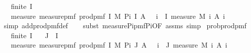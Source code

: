 \begin{isabellebody}
\ \ \ {\isachardoublequoteopen}finite\ I{\isachardoublequoteclose}\isanewline
\ \ \ {\isachardoublequoteopen}measure\ {\isacharparenleft}{\kern0pt}measure{\isacharunderscore}{\kern0pt}pmf\ {\isacharparenleft}{\kern0pt}prod{\isacharunderscore}{\kern0pt}pmf\ I\ M{\isacharparenright}{\kern0pt}{\isacharparenright}{\kern0pt}\ {\isacharparenleft}{\kern0pt}Pi\ I\ A{\isacharparenright}{\kern0pt}\ {\isacharequal}{\kern0pt}\ {\isacharparenleft}{\kern0pt}{\isasymProd}\ i\ {\isasymin}\ I{\isachardot}{\kern0pt}\ measure\ {\isacharparenleft}{\kern0pt}M\ i{\isacharparenright}{\kern0pt}\ {\isacharparenleft}{\kern0pt}A\ i{\isacharparenright}{\kern0pt}{\isacharparenright}{\kern0pt}{\isachardoublequoteclose}\isanewline
%
\isadelimproof
\ \ %
\endisadelimproof
%
\isatagproof
{}\isamarkupfalse%
\ {\isacharparenleft}{\kern0pt}simp\ add{\isacharcolon}{\kern0pt}prod{\isacharunderscore}{\kern0pt}pmf{\isacharunderscore}{\kern0pt}def{\isacharparenright}{\kern0pt}\isanewline
\ \ \isamarkupfalse%
\ {\isacharparenleft}{\kern0pt}subst\ measure{\isacharunderscore}{\kern0pt}Pi{\isacharunderscore}{\kern0pt}pmf{\isacharunderscore}{\kern0pt}Pi{\isacharbrackleft}{\kern0pt}OF\ assms{\isacharparenleft}{\kern0pt}{}{\isacharparenright}{\kern0pt}{\isacharbrackright}{\kern0pt}{\isacharcomma}{\kern0pt}\ simp{\isacharparenright}{\kern0pt}%
\endisatagproof
{\isafoldproof}%
%
\isadelimproof
\isanewline
%
\endisadelimproof
\isanewline
{}\isamarkupfalse%
\ prob{\isacharunderscore}{\kern0pt}prod{\isacharunderscore}{\kern0pt}pmf{\isacharprime}{\kern0pt}{\isacharcolon}{\kern0pt}\ \isanewline
\ \ \ {\isachardoublequoteopen}finite\ I{\isachardoublequoteclose}\isanewline
\ \ \ {\isachardoublequoteopen}J\ {\isasymsubseteq}\ I{\isachardoublequoteclose}\isanewline
\ \ \ {\isachardoublequoteopen}measure\ {\isacharparenleft}{\kern0pt}measure{\isacharunderscore}{\kern0pt}pmf\ {\isacharparenleft}{\kern0pt}prod{\isacharunderscore}{\kern0pt}pmf\ I\ M{\isacharparenright}{\kern0pt}{\isacharparenright}{\kern0pt}\ {\isacharparenleft}{\kern0pt}Pi\ J\ A{\isacharparenright}{\kern0pt}\ {\isacharequal}{\kern0pt}\ {\isacharparenleft}{\kern0pt}{\isasymProd}\ i\ {\isasymin}\ J{\isachardot}{\kern0pt}\ measure\ {\isacharparenleft}{\kern0pt}M\ i{\isacharparenright}{\kern0pt}\ {\isacharparenleft}{\kern0pt}A\ i{\isacharparenright}{\kern0pt}{\isacharparenright}{\kern0pt}{\isachardoublequoteclose}\isanewline
%
\isadelimproof
%
\endisadelimproof
%
\isatagproof
{}\isamarkupfalse%

\end{isabellebody}
